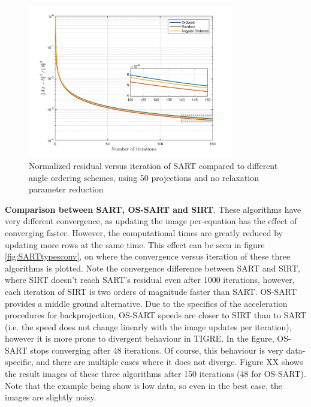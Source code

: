 \begin{figure}[H]
\begin{center}

\includegraphics[width=0.8\textwidth]{Applications/SARTangles.png} 
\end{center}

\caption[Nomralized residual vs iteration of SART vs projection update order]{\label{fig:SARTanglesconv} Normalized residual versus iteration of SART compared to different angle ordering schemes, using 50 projections and no relaxation parameter reduction} 
\end{figure}

\textbf{Comparison between SART, OS-SART and SIRT}. These algorithms have very different convergence, as updating the image per-equation has the effect of converging faster. However, the computational times are greatly reduced by updating more rows at the same time. This effect can be seen in figure \ref{fig:SARTtypesconv}, on where the convergence versus iteration of these three algorithms is plotted. Note the convergence difference between SART and SIRT, where SIRT doesn't reach SART's residual even after 1000 iterations, however, each iteration of SIRT is two orders of magnitude faster than SART. OS-SART provides a middle ground alternative. Due to the specifics of the acceleration procedures for backprojection, OS-SART speeds are closer to SIRT than to SART (i.e. the speed does not change linearly with the image updates per iteration), however it is more prone to divergent behaviour in TIGRE. In the figure, OS-SART stops converging after 48 iterations. Of course, this behaviour is very data-specific, and there are multiple cases where it does not diverge. Figure XX shows the result images of these three algorithms after 150 iterations (48 for OS-SART). Note that the example being show is low data, so even in the best case, the images are slightly noisy.



